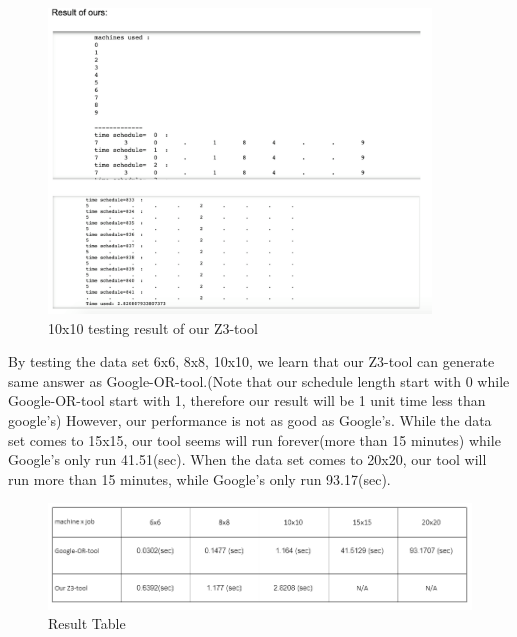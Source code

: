 \begin{figure}[H]
\centering
\includegraphics[width=4in]{img/sat.png}
\caption{10x10 testing result of our Z3-tool}
\end{figure}


By testing the data set 6x6, 8x8, 10x10, we learn that our Z3-tool can generate same
answer as Google-OR-tool.(\*Note that our schedule length start with 0 while
Google-OR-tool start with 1, therefore our result will be 1 unit time less than
google's) However, our performance is not as good as Google's. While the data set
comes to 15x15, our tool seems will run forever(more than 15 minutes) while Google's
only run 41.51(sec). When the data set comes to 20x20, our tool will run more than 15 minutes, while Google's only run 93.17(sec).      

\begin{figure}[H]
\centering
\includegraphics[width=6in]{img/4.PNG}
\caption{Result Table}
\end{figure}